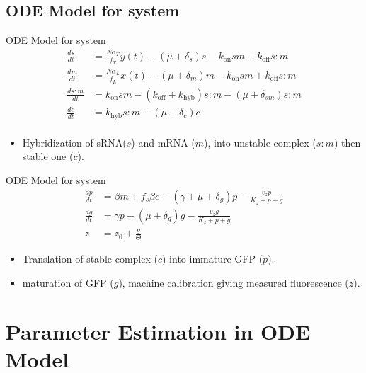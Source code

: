 \documentclass{beamer}
\begin{document}
\subsection{ODE Model for system}
\begin{frame}{ODE Model for system}{}
\begin{align*} 
\frac{ds}{dt} &= \frac{N\alpha_{T}}{f_{T}} y(t)-(\mu + \delta_{s})s -k_{\mathrm{on}}sm +k_{\mathrm{off}}s:m \\
\frac{dm}{dt} &=  \frac{N\alpha_{L}}{f_{L}}x(t)-(\mu + \delta_{m})m -k_{\mathrm{on}}sm +k_{\mathrm{off}}s:m  \\
\frac{ds:m}{dt} & = k_{\mathrm{on}}sm  - (k_{\mathrm{off}}+ k_{\mathrm{hyb}})s:m  -(\mu + \delta_{sm} )s:m \\
\frac{dc}{dt} & = k_{\mathrm{hyb}}s:m  -(\mu + \delta_{c})c  \\
\end{align*}
\vspace{-3em}
  \begin{itemize}
    \item  Hybridization of sRNA($s$) and mRNA ($m$), into unstable complex ($s:m$) then stable one ($c$).
    \end{itemize}
\end{frame}

\begin{frame}{ODE Model for system}{}
\begin{align*} 
\frac{dp}{dt} & = \beta m +f_{s}\beta c -(\gamma + \mu + \delta_{g})p - \frac{v_{z}p}{K_{z}+p+g}   \\
\frac{dg}{dt} & = \gamma p - (\mu + \delta_{g})g - \frac{v_{z}g}{K_{z}+p+g} \\
z &= z_{0} +\frac{g}{\Theta} 
\end{align*}

  \begin{itemize}
    \item Translation of stable complex ($c$) into immature GFP ($p$). 
    \item maturation of GFP ($g$), machine calibration giving measured fluorescence ($z$).
    \end{itemize}

\end{frame}

\section{Parameter Estimation in ODE Model}
\end{document}

